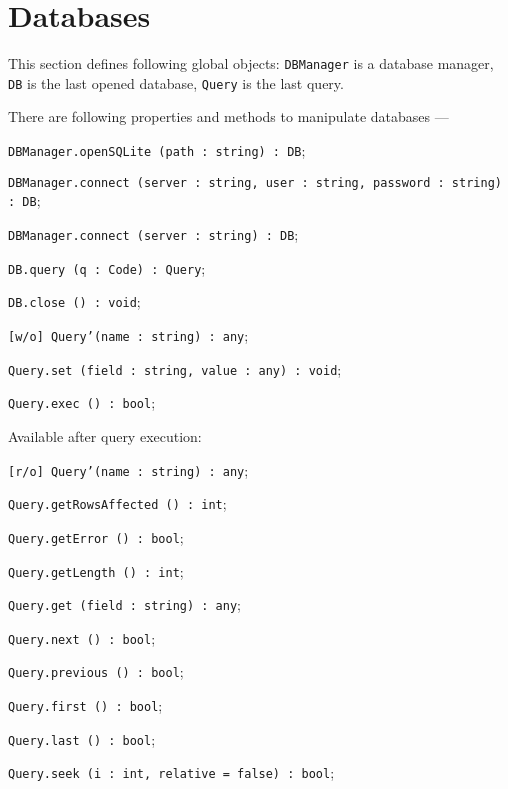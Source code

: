 \section{Databases}

This section defines following global objects: \texttt{DBManager} is a database manager, \texttt{DB} is the last opened database, \texttt{Query} is the last query.

There are following properties and methods to manipulate databases —
\begin{icItems}
	\item \texttt{DBManager.openSQLite (path : string) : DB};
	\item \texttt{DBManager.connect (server : string, user : string, password : string) : DB};
	\item \texttt{DBManager.connect (server : string) : DB};
	\item \texttt{DB.query (q : Code) : Query};
	\item \texttt{DB.close () : void};
	\item \texttt{[w/o] Query'(name : string) : any};
	\item \texttt{Query.set (field : string, value : any) : void};
	\item \texttt{Query.exec () : bool};
	\item Available after query execution:
	\begin{icItems}
		\item \texttt{[r/o] Query'(name : string) : any};
		\item \texttt{Query.getRowsAffected () : int};
		\item \texttt{Query.getError () : bool};
		\item \texttt{Query.getLength () : int};
		\item \texttt{Query.get (field : string) : any};
		\item \texttt{Query.next () : bool};
		\item \texttt{Query.previous () : bool};
		\item \texttt{Query.first () : bool};
		\item \texttt{Query.last () : bool};
		\item \texttt{Query.seek (i : int, relative = false) : bool};
	\end{icItems}
\end{icItems}


